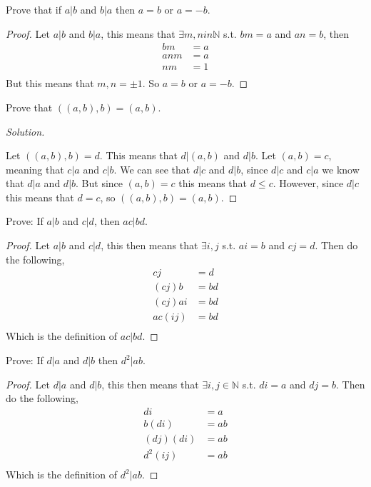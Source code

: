 \documentclass[11pt]{article}
\newcommand{\N}{\mathbb{N}}
\newenvironment{problem}[2][Problem]{\begin{trivlist}
\item[\hskip \labelsep {\bfseries #1}\hskip \labelsep {\bfseries #2.}]}{\end{trivlist}}
\newenvironment{solution}
  {\renewcommand\qedsymbol{$~$}\begin{proof}[Solution]$ $\par\nobreak\ignorespaces}
  {\end{proof}}
\begin{document}
\begin{problem}{7}
Prove that if $a|b$ and $b|a$ then $a=b$ or $a=-b$.
\end{problem}

\begin{proof}
  Let $a|b$ and $b|a$, this means that $\exists m,n in \N$ s.t. $bm=a$ and $an=b$, then
  \begin{align*}
    bm  & = a \\
    anm & = a \\
    nm  & = 1 \\
  \end{align*}
  But this means that $m,n=\pm 1$. So $a=b$ or $a=-b$.
\end{proof}



\begin{problem}{9}
Prove that $((a,b),b)=(a,b)$.
\end{problem}

\begin{solution}
  Let $((a,b),b)=d$. This means that $d|(a,b)$ and $d|b$. Let $(a,b)=c$, meaning that $c|a$ and $c|b$. We can see that $d|c$ and $d|b$, since $d|c$ and $c|a$ we know that $d|a$ and $d|b$. But since $(a,b)=c$ this means that $d\leq c$. However, since $d|c$ this means that $d=c$, so $((a,b),b)=(a,b)$.
\end{solution}



\begin{problem}{12}
Prove: If $a|b$ and $c|d$, then $ac|bd$.
\end{problem}

\begin{proof}
  Let $a|b$ and $c|d$, this then means that $\exists i,j$ s.t. $ai=b$ and $cj=d$. Then do the following,
  \begin{align*}
    cj     & = d  \\
    (cj)b  & = bd \\
    (cj)ai & = bd \\
    ac(ij) & = bd \\
  \end{align*}
  Which is the definition of $ac|bd$.
\end{proof}




\begin{problem}{13}
Prove: If $d|a$ and $d|b$ then $d^2|ab$.
\end{problem}

\begin{proof}
  Let $d|a$ and $d|b$, this then means that $\exists i,j \in \N$ s.t. $di=a$ and $dj=b$. Then do the following,
  \begin{align*}
    di       & = a  \\
    b(di)    & = ab \\
    (dj)(di) & = ab \\
    d^2 (ij) & = ab \\
  \end{align*}
  Which is the definition of $d^2|ab$.
\end{proof}
\end{document}
